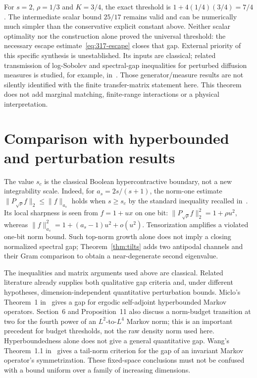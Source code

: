 \documentclass[11pt]{article}
\begin{document}
For $s=2$, $\rho=1/3$ and $K=3/4$, the exact threshold is
$1+4(1/4)(3/4)=7/4$. The intermediate scalar bound $25/17$ remains
valid and can be numerically much simpler than the conservative explicit
constant above. Neither scalar optimality nor the construction alone
proved the universal threshold: the necessary escape
estimate~\eqref{eq:317-escape} closes that gap. External priority of this
specific synthesis is unestablished. Its inputs are classical; related
transmission of log-Sobolev and spectral-gap inequalities for perturbed
diffusion measures is studied, for example, in~\cite{Cattiaux}.
Those generator/measure results are not silently identified with the
finite transfer-matrix statement here. This theorem does not add marginal
matching, finite-range interactions or a physical interpretation.

\section{Comparison with hyperbounded and perturbation results}
The value $s_c$ is the classical Boolean hypercontractive boundary,
not a new integrability scale. Indeed, for $a_s=2s/(s+1)$, the
norm-one estimate $\|P_{\sqrt\rho}f\|_2\le\|f\|_{a_s}$ holds
when $s\ge s_c$ by the standard inequality recalled in~\cite{MOS}.
Its local sharpness is seen from $f=1+ux$ on one bit:
$\|P_{\sqrt\rho}f\|_2^2=1+\rho u^2$, whereas
$\|f\|_{a_s}^2=1+(a_s-1)u^2+o(u^2)$.
Tensorization amplifies a violated one-bit norm bound. Such top-norm
growth alone does not imply a closing normalized spectral gap;
Theorem~\ref{thm:tilts} adds two antipodal channels and their Gram
comparison to obtain a near-degenerate second eigenvalue.

The inequalities and matrix arguments used above are classical. Related
literature already supplies both qualitative gap criteria and, under
different hypotheses, dimension-independent quantitative perturbation
bounds. Miclo's Theorem~1 in~\cite{Miclo} gives a gap for ergodic
self-adjoint hyperbounded Markov operators. Section~6 and
Proposition~11 also discuss a norm-budget transition at two for the
fourth power of an $L^2$-to-$L^4$ Markov norm; this is an important
precedent for budget thresholds, not the raw density norm used here.
Hyperboundedness alone does not give a general quantitative gap. Wang's Theorem~1.1 in~\cite{Wang} gives a tail-norm criterion
for the gap of an invariant Markov operator's symmetrization.
These fixed-space conclusions must not be confused with a bound uniform
over a family of increasing dimensions.
\end{document}
